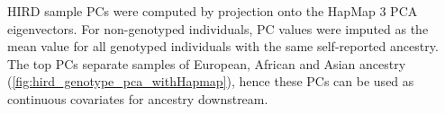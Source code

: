 \gls{HIRD} sample \glspl{PC} were computed by projection onto the HapMap 3 \gls{PCA} eigenvectors.
For non-genotyped individuals, \gls{PC} values were imputed as the mean value for all genotyped individuals with the same self-reported ancestry.
The top \glspl{PC} separate samples of European, African and Asian ancestry (\autoref{fig:hird_genotype_pca_withHapmap}), hence these \glspl{PC} can be used as continuous covariates for ancestry downstream.

